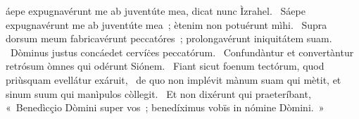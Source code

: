 \psalmChapterWithInscription{}
{ }
{%
áepe expugnavérunt me ab juventúte mea, dicat nunc Ìzrahel. 
~Sáepe expugnavérunt me ab juventúte mea~; ètenim non potuérunt mìhi. 
~Supra dorsum meum fabricavérunt peccatóres~; prolongavérunt iniquitátem suam. 
~Dòminus justus concáedet cervíċes peccatórum. 
~Confundàntur et convertàntur retrósum òmnes qui odérunt Siónem. 
~Fiant sicut foenum tectórum, quod priùsquam evellátur exáruit, 
~de quo non implévit mànum suam qui mètit, et sinum suum qui manìpulos còllegit. 
~Et non dixérunt qui praeteríbant, «~Benedìcçio Dòmini super vos~; benedíximus vobïs in nómine Dòmini.~»
}
